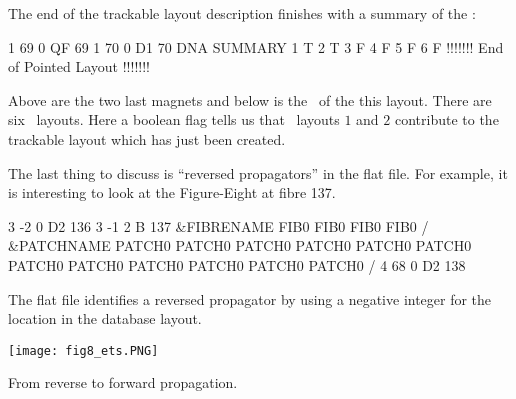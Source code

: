 {{The end of the trackable layout description finishes with a summary of the \DNA :


\begin{ptccode}
    1       69  0 QF                             69
    1       70  0 D1                             70                     
  DNA SUMMARY   \label{lin:end:dna}
           1 T
           2 T
           3 F
           4 F
           5 F
           6 F
  !!!!!!! End of Pointed Layout !!!!!!!

\end{ptccode}

Above  are the two last magnets and below is  the \DNA\ of the this layout. There are six  \DNA\ layouts. Here a boolean flag tells us that \DNA\ layouts $1$ and $2$ contribute to  the trackable layout which has just been created.

The last thing to discuss is ``reversed propagators'' in the flat file. For example, it is interesting to look at the Figure-Eight at fibre 137. 


\begin{ptccode}
    3       -2  0 D2                            136
    3       -1  2 B                             137
 &FIBRENAME
 FIB0%
 FIB0%
 FIB0%
 FIB0%
 /
 &PATCHNAME
 PATCH0%
 PATCH0%
 PATCH0%
 PATCH0%
 PATCH0%
 PATCH0%
 PATCH0%
 PATCH0%
 PATCH0%
 PATCH0%
 PATCH0%
 PATCH0%
 /
    4       68  0 D2                            138
\end{ptccode}

The flat file identifies a reversed propagator by using a negative integer for the location in the database layout.  
\begin{marginfigure}\forcerectofloat
  \texttt{[image: fig8\_ets.PNG]}
  \caption{From reverse to forward propagation.}
  \label{fig:min:plus}
\end{marginfigure}
%
%

}}
